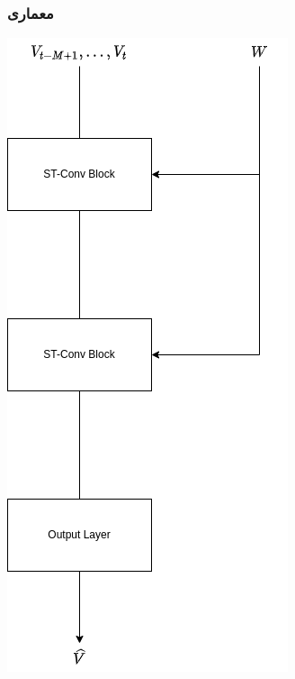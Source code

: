 \documentclass{beamer}
\begin{document}
\begin{frame}
  \frametitle{معماری}
  \includegraphics[height=.8\textheight]{img/arch-1.png}
\end{frame}
\end{document}
